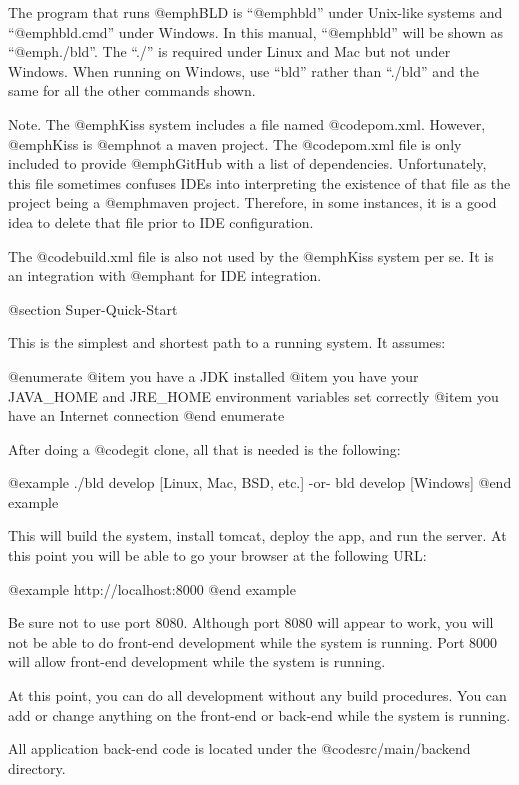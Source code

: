 The program that runs @emph{BLD} is ``@emph{bld}'' under Unix-like
systems and ``@emph{bld.cmd}'' under Windows.  In this manual,
``@emph{bld}'' will be shown as ``@emph{./bld}''.  The ``./'' is
required under Linux and Mac but not under Windows.  When running on
Windows, use ``bld'' rather than ``./bld'' and the same for all the
other commands shown.

Note.  The @emph{Kiss} system includes a file named @code{pom.xml}.
However, @emph{Kiss} is @emph{not} a maven project.  The
@code{pom.xml} file is only included to provide @emph{GitHub} with a
list of dependencies.  Unfortunately, this file sometimes confuses IDEs
into interpreting the existence of that file as the project being a
@emph{maven} project.  Therefore, in some instances, it is a good idea
to delete that file prior to IDE configuration.

The @code{build.xml} file is also not used by the @emph{Kiss} system per se.
It is an integration with @emph{ant} for IDE integration.


@section Super-Quick-Start

This is the simplest and shortest path to a running system.  It assumes:

@enumerate
@item
you have a JDK installed
@item
you have your JAVA_HOME and JRE_HOME environment variables set correctly
@item
you have an Internet connection
@end enumerate

After doing a @code{git clone}, all that is needed is the following:

@example
    ./bld  develop                      [Linux, Mac, BSD, etc.]
         -or-
    bld  develop                        [Windows]
@end example

This will build the system, install tomcat, deploy the app, and run
the server.  At this point you will be able to go your browser at the
following URL:

@example
    http://localhost:8000
@end example

Be sure not to use port 8080.  Although port 8080 will appear to work,
you will not be able to do front-end development while the system is
running.  Port 8000 will allow front-end development while the system
is running.

At this point, you can do all development without any build
procedures.  You can add or change anything on the front-end or
back-end while the system is running.

All application back-end code is located under the @code{src/main/backend}
directory.

